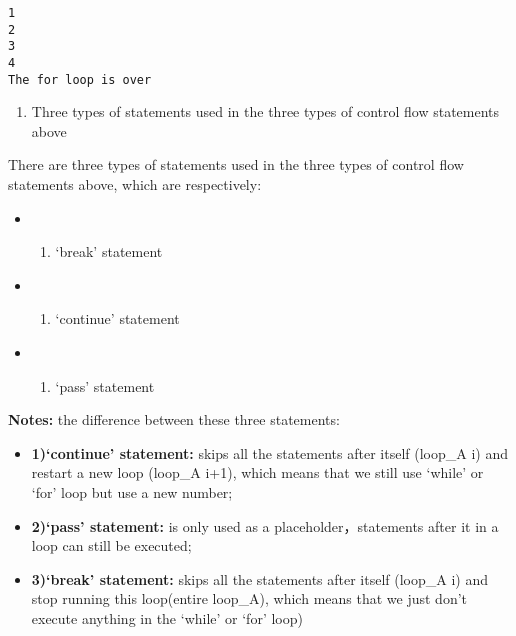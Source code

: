 \documentclass[11pt]{article}
\providecommand{\tightlist}{%
      \setlength{\itemsep}{0pt}\setlength{\parskip}{0pt}}
\begin{document}
    \begin{Verbatim}[commandchars=\\\{\}]
1
2
3
4
The for loop is over
    \end{Verbatim}

    \begin{enumerate}
\def\labelenumi{\arabic{enumi}.}
\setcounter{enumi}{1}
\tightlist
\item
  Three types of statements used in the three types of control flow
  statements above
\end{enumerate}

    There are three types of statements used in the three types of control
flow statements above, which are respectively:

\begin{itemize}
\item
  \begin{enumerate}
  \def\labelenumi{(\arabic{enumi})}
  \tightlist
  \item
    `break' statement
  \end{enumerate}
\item
  \begin{enumerate}
  \def\labelenumi{(\arabic{enumi})}
  \setcounter{enumi}{1}
  \tightlist
  \item
    `continue' statement
  \end{enumerate}
\item
  \begin{enumerate}
  \def\labelenumi{(\arabic{enumi})}
  \setcounter{enumi}{2}
  \tightlist
  \item
    `pass' statement
  \end{enumerate}
\end{itemize}

\textbf{Notes:} the difference between these three statements:

\begin{itemize}
\item
  \textbf{1)`continue' statement:} skips all the statements after itself
  (loop\_A i) and restart a new loop (loop\_A i+1), which means that we
  still use `while' or `for' loop but use a new number;
\item
  \textbf{2)`pass' statement:} is only used as a placeholder，statements
  after it in a loop can still be executed;
\item
  \textbf{3)`break' statement:} skips all the statements after itself
  (loop\_A i) and stop running this loop(entire loop\_A), which means
  that we just don't execute anything in the `while' or `for' loop)
\end{itemize}
\end{document}
